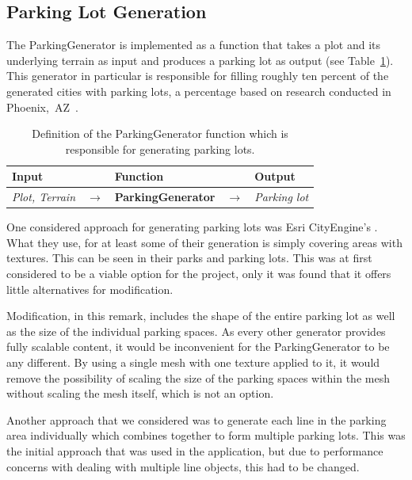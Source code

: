 \subsection{Parking Lot Generation}
The ParkingGenerator is implemented as a function that takes a plot and its underlying terrain as input and produces a parking lot as output (see Table~\ref{table:parking}).
This generator in particular is responsible for filling roughly ten percent of the generated cities with parking lots, a percentage based on research conducted in Phoenix,~AZ~\cite{parking_percent}.
\begin{table}[H]
   \centering
   \begin{tabular}{lllll}
     \textbf{Input}                           &               & \textbf{Function}            &               & \textbf{Output}         \\
     \midrule
     \textit{Plot, Terrain}                   & $\rightarrow$ & \textbf{ParkingGenerator}       & $\rightarrow$ & \textit{Parking lot}           \\
     \bottomrule
   \end{tabular}

   \caption{Definition of the ParkingGenerator function which is responsible for generating parking lots.}
   \label{table:parking}
 \end{table}
 \vspace{-0.4cm}

One considered approach for generating parking lots was Esri CityEngine's \cite{Esri}.  %
What they use, for at least some of their generation is simply covering areas with textures. This can be seen in their parks and parking lots. 
This was at first considered to be a viable option for the project, only it was found that it offers little alternatives for modification.

Modification, in this remark, includes the shape of the entire parking lot as well as the size of the individual parking spaces.
As every other generator provides fully scalable content, it would be inconvenient for the ParkingGenerator to be any different.
By using a single mesh with one texture applied to it, it would remove the possibility of scaling the size of the parking spaces within the mesh without scaling the mesh itself, which is not an option.

Another approach that we considered was to generate each line in the parking area individually which combines together to form multiple parking lots.
This was the initial approach that was used in the application, but due to performance concerns with dealing with multiple line objects, this had to be changed.

